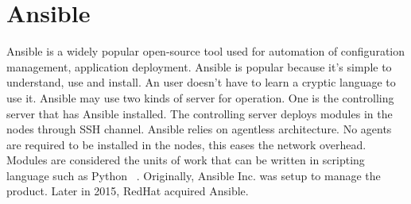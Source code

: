 \section{Ansible}

Ansible is a widely popular open-source tool used for automation of configuration management,
application deployment. Ansible is popular because it’s simple to understand, use and install.
An user doesn’t have to learn a cryptic language to use it.
Ansible may use two kinds of server for operation. One is the controlling server that has Ansible installed.
The controlling server deploys modules in the nodes through SSH channel. Ansible relies on agentless architecture.
No agents are required to be installed in the nodes, this eases the network overhead.
Modules are considered the units of work that can be written in scripting language such as Python
~\cite {hid-sp18-417-wiki-Ansible}.
Originally, Ansible Inc. was setup to manage the product. Later in 2015, RedHat acquired Ansible.
